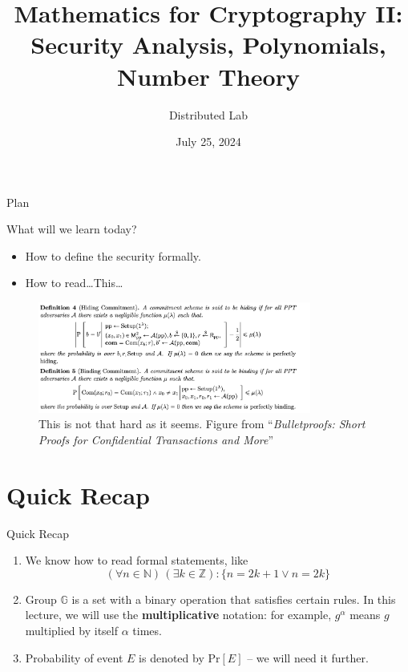 \documentclass{beamer}
\title[Mathematics II]{\textbf{Mathematics for Cryptography II: Security Analysis, Polynomials, Number Theory}}
\author{Distributed Lab}
\date{July 25, 2024}
\begin{document}
    \frame {
      \titlepage
    }
  
    \begin{frame}{Plan}
      \tableofcontents
    \end{frame}

    \begin{frame}{What will we learn today?}
        \begin{itemize}
            \item How to define the security formally.
            \item How to read\ldots This\ldots\pause
        \end{itemize}
        \begin{figure}
            \includegraphics[width=0.8\textwidth]{images/lecture_2/bulletproof.png}
            \caption{This is not that hard as it seems. Figure from ``\textit{Bulletproofs: Short Proofs for Confidential Transactions and More}''}
            \label{fig:wuuttt}
        \end{figure}
    \end{frame}

    \section{Quick Recap}

    \begin{frame}{Quick Recap}
        \begin{enumerate}
            \item We know how to read formal statements, like 
            \begin{equation*}
                (\forall n \in \mathbb{N}) \, (\exists k \in \mathbb{Z}): \{n=2k+1 \vee n = 2k\}
            \end{equation*}
            \item \pause Group $\mathbb{G}$ is a set with a binary operation that satisfies certain rules. In this lecture, we will use the \textbf{multiplicative} notation: for example, $g^{\alpha}$ means $g$ multiplied by itself $\alpha$ times.\pause
            \item Probability of event $E$ is denoted by $\text{Pr}[E]$ -- we will need it further.
        \end{enumerate}
    \end{frame}
\end{document}

